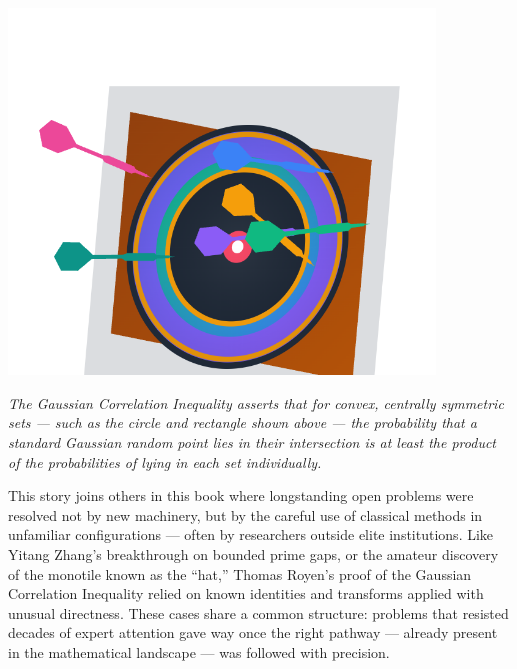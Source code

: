 \begin{center}
\includegraphics[width=0.85\textwidth]{33_IncubationInequality/svgviewer-png-output.png}

\vspace{0.5em}
{\small\emph{The Gaussian Correlation Inequality asserts that for convex, centrally symmetric sets — such as the circle and rectangle shown above — the probability that a standard Gaussian random point lies in their intersection is at least the product of the probabilities of lying in each set individually.}}
\end{center}


\begin{commentary}
This story joins others in this book where longstanding open problems were resolved not by new machinery, but by the careful use of classical methods in unfamiliar configurations — often by researchers outside elite institutions. Like Yitang Zhang’s breakthrough on bounded prime gaps, or the amateur discovery of the monotile known as the “hat,” Thomas Royen’s proof of the Gaussian Correlation Inequality relied on known identities and transforms applied with unusual directness. These cases share a common structure: problems that resisted decades of expert attention gave way once the right pathway — already present in the mathematical landscape — was followed with precision.
\end{commentary}

